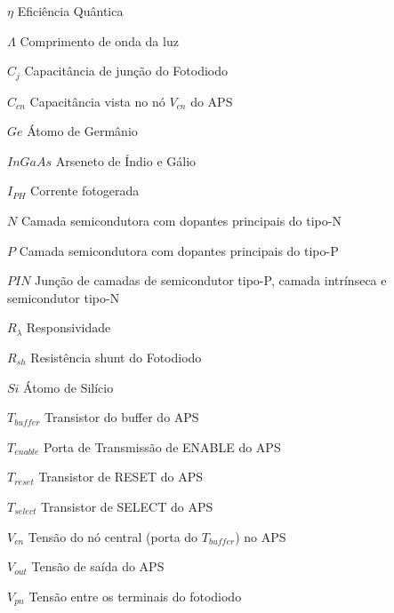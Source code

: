 \begin{simbolos}
  \item[$ \eta $] Eficiência Quântica
  \item[$ \Lambda $] Comprimento de onda da luz
  \item[$ C_j $] Capacitância de junção do Fotodiodo
  \item[$ C_{cn}$] Capacitância vista no nó $V_{cn}$ do APS
  \item[$ Ge $] Átomo de Germânio
  \item[$ InGaAs $] Arseneto de Índio e Gálio
  \item[$ I_{PH} $] Corrente fotogerada
  \item[$ N $] Camada semicondutora com dopantes principais do tipo-N
  \item[$ P $] Camada semicondutora com dopantes principais do tipo-P
  \item[$ PIN $] Junção de camadas de semicondutor tipo-P, camada intrínseca e semicondutor tipo-N
  \item[$ R_\lambda $] Responsividade
  \item[$ R_{sh} $] Resistência shunt do Fotodiodo
  \item[$ Si $] Átomo de Silício
  \item[$ T_{buffer} $] Transistor do buffer do APS
  \item[$ T_{enable} $] Porta de Transmissão de ENABLE do APS
  \item[$ T_{reset} $] Transistor de RESET do APS
  \item[$ T_{select} $] Transistor de SELECT do APS
  
  
  \item[$ V_{cn} $] Tensão do nó central (porta do $T_{buffer}$) no APS
  \item[$ V_{out} $] Tensão de saída do APS
  \item[$V_{pn}$] Tensão entre os terminais do fotodiodo
  
\end{simbolos}
